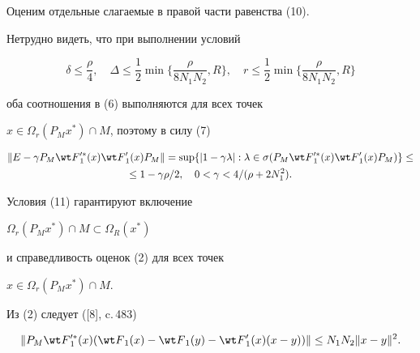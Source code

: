 Оценим отдельные слагаемые в правой части равенства (10).


Нетрудно видеть, что при выполнении условий


\begin{equation}


\delta \leq \frac{\rho}{4}, \quad


\Delta \leq \frac{1}{2}


\min\bigg\{ \frac{\rho}{8 N_1 N_2}, R \bigg\}, \quad


r \leq \frac{1}{2}


\min\bigg\{ \frac{\rho}{8 N_1 N_2}, R \bigg\}


\end{equation}


оба соотношения в (6) выполняются для всех точек


$x \in \Omega_r (P_M x^*) \cap M$, поэтому в силу (7)


\begin{multline}


\Vert E-\gamma P_M {\wt F}{}_1^{\prime *}(x) {\wt F}{}_1^{\prime}(x) P_M


\Vert =\sup \{ \vert 1-\gamma \lambda \vert:


\lambda \in \sigma


(P_M {\wt F}{}_1^{\prime *}(x) {\wt F}{}_1^{\prime}(x) P_M) \}\leq \\


%


\leq 1-\gamma \rho/2, \quad 0<\gamma<4/(\rho+2 N_1^2).


\end{multline}


Условия (11) гарантируют включение


$\Omega_r (P_M x^*) \cap M \subset \Omega_R (x^*)$


и справедливость оценок (2) для всех точек


$x \in \Omega_r (P_M x^*) \cap M$.


Из (2) следует ([8], c.\,483)


\begin{equation}


\Vert P_M {\wt F}{}_1^{\prime *} (x)


({\wt F}_1 (x) - {\wt F}_1 (y)-


{\wt F}{}_1^{\prime}(x) (x-y) ) \Vert \leq


N_1 N_2 \Vert x-y \Vert^2.


\end{equation}


